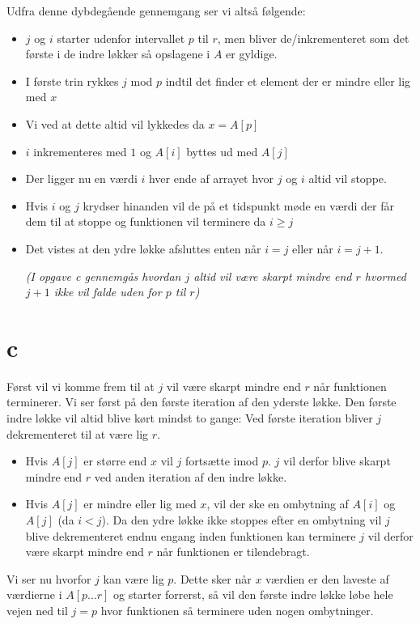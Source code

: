 \documentclass[10pt,a4paper,danish]{article}
\begin{document}
Udfra denne dybdegående gennemgang ser vi altså følgende:
\begin{itemize}
\item $j$ og $i$ starter udenfor intervallet $p$ til $r$, men bliver de/inkrementeret som det første i de indre løkker så opslagene i $A$ er gyldige.
\item I første trin rykkes $j$ mod $p$ indtil det finder et element der er mindre eller lig med $x$
\item Vi ved at dette altid vil lykkedes da $x = A[p]$
\item $i$ inkrementeres med $1$ og $A[i]$ byttes ud med $A[j]$
\item Der ligger nu en værdi $i$ hver ende af arrayet hvor $j$ og $i$ altid vil stoppe.
\item Hvis $i$ og $j$ krydser hinanden vil de på et tidspunkt møde en værdi der får dem til at stoppe og funktionen vil terminere da $i \geq j$
\item {
    Det vistes at den ydre løkke afsluttes enten når $i=j$ eller når $i=j + 1$.

    \textit{(I opgave c gennemgås hvordan $j$ altid vil være skarpt mindre end $r$ hvormed $j+1$ ikke vil falde uden for $p$ til $r$)}
}
\end{itemize}

\section{c}
Først vil vi komme frem til at $j$ vil være skarpt mindre end $r$ når funktionen terminerer.
Vi ser først på den første iteration af den yderste løkke.
Den første indre løkke vil altid blive kørt mindst to gange: Ved første iteration bliver $j$ dekrementeret til at være lig $r$. 
\begin{itemize}
\item Hvis $A[j]$ er større end $x$ vil $j$ fortsætte imod $p$. $j$ vil derfor blive skarpt mindre end $r$ ved anden iteration af den indre løkke.
\item Hvis $A[j]$ er mindre eller lig med $x$, vil der ske en ombytning af $A[i]$ og $A[j]$ (da $i < j$). Da den ydre løkke ikke stoppes efter en ombytning vil $j$ blive dekrementeret endnu engang inden funktionen kan terminere $j$ vil derfor være skarpt mindre end $r$ når funktionen er tilendebragt. 
\end{itemize}

Vi ser nu hvorfor $j$ kan være lig $p$.
Dette sker når $x$ værdien er den laveste af værdierne i $A[p \ldots r]$ og starter forrerst, så vil den første indre løkke løbe hele vejen ned til $j=p$ hvor funktionen så terminere uden nogen ombytninger.
\end{document}
